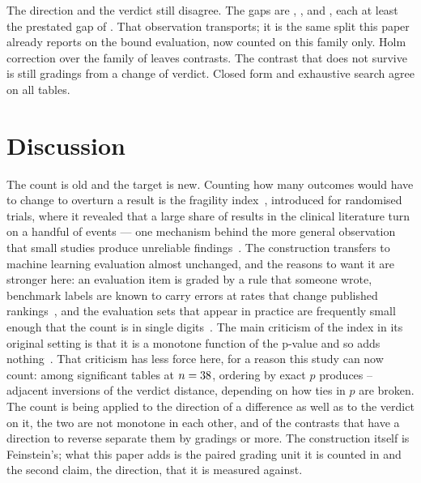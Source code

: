 The direction and the verdict still disagree. The \SecondEvalN{} gaps are
\SecondEvalGapArc{}, \SecondEvalGapGsm{}, and \SecondEvalGapWino{},
each at least the prestated gap of \DecoupledGap{}. That observation
transports; it is the same split this paper already reports on the
bound evaluation, now counted on this family only. Holm correction
over the family of \SecondEvalN{} leaves
\SecondEvalHolmSurvivors{} contrasts. The contrast that does not
survive is still \SecondEvalKappaVerWino{} gradings from a change of
verdict. Closed form and exhaustive search agree on all \SecondEvalN{} tables.

\section{Discussion}

The count is old and the target is new. Counting how many outcomes would have
to change to overturn a result is the fragility
index~\cite{feinstein1990unit,walsh2014statistical}, introduced for randomised
trials, where it revealed that a large share of results in the clinical
literature turn on a handful of events --- one mechanism behind the more general
observation that small studies produce unreliable
findings~\cite{ioannidis2005why}. The construction transfers to machine
learning evaluation almost unchanged, and the reasons to want it are stronger
here: an evaluation item is graded by a rule that someone wrote, benchmark labels
are known to carry errors at rates that change published
rankings~\cite{northcutt2021pervasive}, and the evaluation sets that appear in
practice are frequently small enough that the count is in single
digits~\cite{card2020little}. The main criticism of the index in its original
setting is that it is a monotone function of the p-value and so adds
nothing~\cite{carter2017fragility}. That criticism has less force here, for a
reason this study can now count: among \KappaVerSigTables{} significant tables
at \(n=38{}\), ordering by exact \(p\) produces
\KappaVerInversionsLow{}--\KappaVerInversionsHigh{} adjacent inversions of the
verdict distance, depending on how ties in \(p\) are broken. The count is being
applied to the direction of a difference as well as to the verdict on it, the
two are not monotone in each other, and \DecoupledCount{} of the \Directional{}
contrasts that have a direction to reverse separate them by \DecoupledGap{}
gradings or more. The construction itself is Feinstein's; what this paper adds
is the paired grading unit it is counted in and the second claim, the
direction, that it is measured against.


